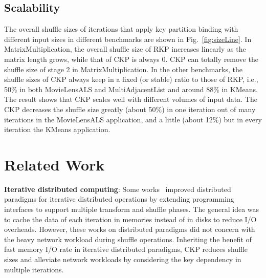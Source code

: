 \documentclass[10pt,journal,compsoc]{IEEEtran}
\begin{document}
\subsection{Scalability}
The overall shuffle sizes of iterations that apply key partition 
binding with different input sizes in different benchmarks are shown in Fig.~\ref{fig:sizeLine}. 
In MatrixMultiplication, 
the overall shuffle size of RKP increases linearly as the matrix length grows, while that of CKP is always 0. 
CKP can totally remove the shuffle size of stage 2 in MatrixMultiplication. 
In the other benchmarks, the shuffle sizes of CKP always keep in a fixed (or stable) ratio to those of RKP, i.e., 50\% in both MovieLensALS and MultiAdjacentList and around 88\% in KMeans. 
The result shows that CKP scales well with different volumes of input data. 
The CKP decreases the shuffle size greatly (about 50\%) in one iteration out of many iterations in the MovieLensALS application, and a little (about 12\%) but in every iteration the KMeans application. 



\section{Related Work}\label{section:relatedWork}
\textbf{Iterative distributed computing}: 
Some works~\cite{gunarathne2013scalable, zaharia2012resilient,bu2010haloop, ekanayake2010twister} improved distributed paradigms for iterative distributed operations by extending programming interfaces to support multiple transform and shuffle phases. 
The general idea was to cache the data of each iteration in memories instead of in disks to reduce I/O overheads.
However, these works on distributed paradigms did not concern with the heavy network workload during shuffle operations. 
Inheriting the benefit of fast memory I/O rate in iterative distributed paradigms, CKP reduces shuffle sizes and alleviate network workloads by considering the key dependency in multiple iterations. 
\end{document}
